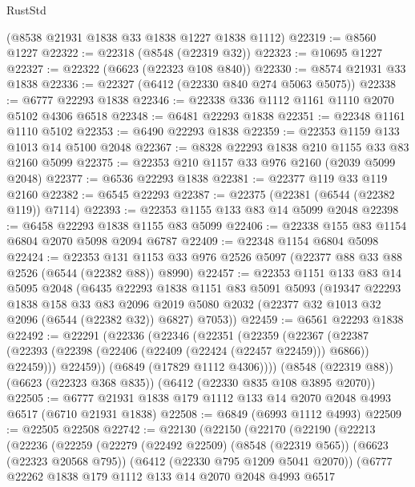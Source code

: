 \begin{lexlean}{RustStd}
\begin{coremodule}
    (@8538 @21931 @1838 @33 @1838 @1227 @1838 @1112)
@22319 := @8560 @1227
@22322 := @22318 (@8548 (@22319 @32))
@22323 := @10695 @1227
@22327 := @22322 (@6623 (@22323 @108 @840))
@22330 := @8574 @21931 @33 @1838
@22336 := @22327 (@6412 (@22330 @840 @274 @5063 @5075))
@22338 := @6777 @22293 @1838
@22346 := @22338 @336 @1112 @1161 @1110 @2070 @5102 @4306 @6518
@22348 := @6481 @22293 @1838
@22351 := @22348 @1161 @1110 @5102
@22353 := @6490 @22293 @1838
@22359 := @22353 @1159 @133 @1013 @14 @5100 @2048
@22367 := @8328 @22293 @1838 @210 @1155 @33 @83 @2160 @5099
@22375 := @22353 @210 @1157 @33 @976 @2160 (@2039 @5099 @2048)
@22377 := @6536 @22293 @1838
@22381 := @22377 @119 @33 @119 @2160
@22382 := @6545 @22293
@22387 := @22375 (@22381 (@6544 (@22382 @119)) @7114)
@22393 := @22353 @1155 @133 @83 @14 @5099 @2048
@22398 := @6458 @22293 @1838 @1155 @83 @5099
@22406 := @22338 @155 @83 @1154 @6804 @2070 @5098 @2094 @6787
@22409 := @22348 @1154 @6804 @5098
@22424 := @22353
    @131
    @1153
    @33
    @976
    @2526
    @5097
    (@22377 @88 @33 @88 @2526 (@6544 (@22382 @88)) @8990)
@22457 := @22353
    @1151
    @133
    @83
    @14
    @5095
    @2048
    (@6435
      @22293
      @1838
      @1151
      @83
      @5091
      @5093
      (@19347
        @22293
        @1838
        @158
        @33
        @83
        @2096
        @2019
        @5080
        @2032
        (@22377 @32 @1013 @32 @2096 (@6544 (@22382 @32)) @6827)
        @7053))
@22459 := @6561 @22293 @1838
@22492 := @22291
    (@22336
      (@22346
        (@22351
          (@22359
            (@22367
              (@22387 (@22393 (@22398 (@22406 (@22409 (@22424 (@22457 @22459))) @6866)) @22459)))
            @22459))
        (@6849 (@17829 @1112 @4306))))
    (@8548 (@22319 @88))
    (@6623 (@22323 @368 @835))
    (@6412 (@22330 @835 @108 @3895 @2070))
@22505 := @6777 @21931 @1838 @179 @1112 @133 @14 @2070 @2048 @4993 @6517 (@6710 @21931 @1838)
@22508 := @6849 (@6993 @1112 @4993)
@22509 := @22505 @22508
@22742 := @22130
    (@22150
      (@22170
        (@22190
          (@22213
            (@22236
              (@22259
                (@22279
                  (@22492 @22509)
                  (@8548 (@22319 @565))
                  (@6623 (@22323 @20568 @795))
                  (@6412 (@22330 @795 @1209 @5041 @2070))
                  (@6777
                    @22262
                    @1838
                    @179
                    @1112
                    @133
                    @14
                    @2070
                    @2048
                    @4993
                    @6517

\end{coremodule}
\end{lexlean}

